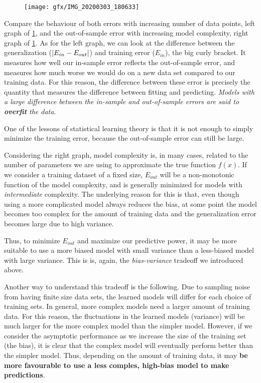 \begin{figure}[h!]
	\centering
	\texttt{[image: gfx/IMG\_20200303\_180633]}
	\caption{}
	\label{fig:errorbehaviour}
\end{figure}
Compare the behaviour of both errors with increasing number of data points, left graph of \ref{fig:errorbehaviour}, and the out-of-sample error with increasing model complexity, right graph of \ref{fig:errorbehaviour}. As for the left graph, we can look at the difference between the generalization ($\abs{E_{in}-E_{out}}$) and training error ($E_{in}$), the big curly bracket. It measures how well our in-sample error reflects the out-of-sample error, and measures how much worse we would do on a new data set compared to our training data. For this reason, the difference between these error is precisely the quantity that measures the difference between fitting and predicting. \emph{Models with a large difference between the in-sample and out-of-sample errors are said to \textbf{overfit} the data}. 
\begin{mybox}{}
	One of the lessons of statistical learning theory is that it is not enough to simply minimize the training error, because the out-of-sample error can still be large.
\end{mybox}
Considering the right graph, model  complexity is, in many cases, related to the number of parameters we are using to approximate the true function $f(x)$. If we consider a training dataset of a fixed size, $E_{out}$ will be a non-monotonic function of the model complexity, and is generally minimized for models with \emph{intermediate} complexity. The underlying reason for this is that, even though using a more complicated model always reduces the bias, at some point the model becomes too complex for the amount of training data and the generalization error becomes large due to high variance.
\begin{mybox}{}
Thus, to minimize $E_{out}$ and maximize our predictive power, it may be more suitable to use a more biased model with small variance than a less-biased model with large variance. This is is, again, the \emph{bias-variance} tradeoff we introduced above.
\end{mybox} 
Another way to understand this tradeoff is the following. Due to sampling noise from having finite size data sets, the learned models will differ for each choice of training sets. In general, more complex models need a larger amount of training data. For this reason, the fluctuations in the learned models (variance) will be much larger for the more complex model than the simpler model. However, if we consider the asymptotic performance as we increase the size of the training set (the bias), it is clear that the complex model will eventually perform better than the simpler model. Thus, depending on the amount of training data, it may \textbf{be more favourable to use a less comples, high-bias model to make predictions}.








